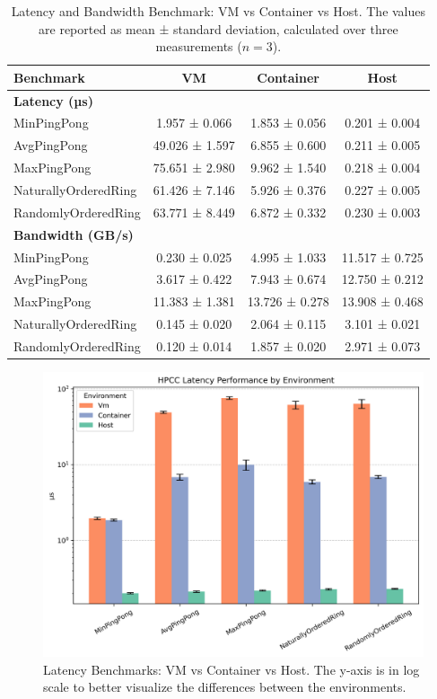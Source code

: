 \begin{table}[H]
\centering
\renewcommand{\arraystretch}{1.2}
\begin{tabular}{lccc}
\toprule
\textbf{Benchmark} & \textbf{VM} & \textbf{Container} & \textbf{Host} \\
\midrule
\multicolumn{4}{l}{\textbf{Latency (µs)}} \\
MinPingPong             & 1.957 ± 0.066 & 1.853 ± 0.056 & 0.201 ± 0.004 \\
AvgPingPong              & 49.026 ± 1.597 & 6.855 ± 0.600 & 0.211 ± 0.005 \\
MaxPingPong              & 75.651 ± 2.980 & 9.962 ± 1.540 & 0.218 ± 0.004 \\
NaturallyOrderedRing    & 61.426 ± 7.146 & 5.926 ± 0.376 & 0.227 ± 0.005 \\
RandomlyOrderedRing     & 63.771 ± 8.449 & 6.872 ± 0.332 & 0.230 ± 0.003 \\
\midrule
\multicolumn{4}{l}{\textbf{Bandwidth (GB/s)}} \\
MinPingPong            & 0.230 ± 0.025 & 4.995 ± 1.033 & 11.517 ± 0.725 \\
AvgPingPong            & 3.617 ± 0.422 & 7.943 ± 0.674 & 12.750 ± 0.212 \\
MaxPingPong            & 11.383 ± 1.381 & 13.726 ± 0.278 & 13.908 ± 0.468 \\
NaturallyOrderedRing  & 0.145 ± 0.020 & 2.064 ± 0.115 & 3.101 ± 0.021 \\
RandomlyOrderedRing   & 0.120 ± 0.014 & 1.857 ± 0.020 & 2.971 ± 0.073 \\
\bottomrule
\end{tabular}
\label{tab:pingpong}
\caption{Latency and Bandwidth Benchmark: VM vs Container vs Host. The values are reported as mean ± standard deviation, calculated over three measurements ($n = 3$).}

\end{table}

\begin{figure}[H]
    \centering
    \includegraphics[width=0.8\linewidth]{assets/hpcc_latency_performance.png}
    \caption{Latency Benchmarks: VM vs Container vs Host. The y-axis is in log scale to better visualize the differences between the environments.}
    \label{fig:hpcc_latency_performance}
\end{figure}

